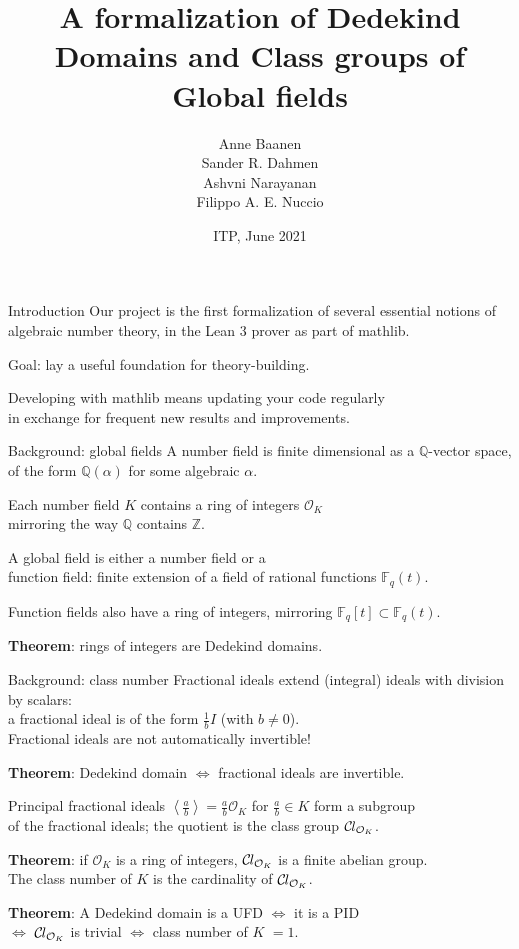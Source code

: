 \documentclass{beamer}
\title{A formalization of Dedekind Domains and Class groups of Global fields}
\author{Anne Baanen \\ Sander R. Dahmen \\ Ashvni Narayanan \\ Filippo A. E. Nuccio}
\date{ITP, June 2021}
\newcommand*{\OK}[1][K]{\mathcal{O}_{#1}}
\newcommand*{\Cl}{\mathcal{C}\kern-.075em l}
\newcommand*{\Fq}[1][q]{\mathbb{F}_{#1}}
\newcommand{\mathlib}{\textsf{mathlib}\xspace}
\newcommand{\Q}{\mathbb{Q}}
\newcommand{\Z}{\mathbb{Z}}
\begin{document}
\begin{frame}
	\maketitle
\end{frame}

\begin{frame}{Introduction}
	Our project is the first formalization of several essential notions of
	\alert{algebraic number theory}, in the Lean 3 prover as part of \mathlib.

	Goal: lay a useful foundation for theory-building.

	Developing with \mathlib means updating your code regularly\\
	in exchange for frequent new results and improvements.
\end{frame}

\begin{frame}{Background: global fields}
	A \alert{number field} is finite dimensional as a $\Q$-vector space,\\
	of the form $\Q(\alpha)$ for some algebraic $\alpha$.

\pause
	Each number field $K$ contains a \alert{ring of integers} $\OK$\\
	mirroring the way $\Q$ contains $\Z$.

\pause
	A \alert{global field} is either a \alert{number field} or a\\
	\alert{function field}: finite extension of a field of rational functions $\Fq(t)$.

	Function fields also have a ring of integers, mirroring $\Fq[q][t] \subset \Fq(t)$.

\pause
	\textbf{Theorem}: rings of integers are \alert{Dedekind domains}.
\end{frame}

\begin{frame}{Background: class number}
	\alert{Fractional ideals} extend (integral) ideals with division by scalars:\\
	a fractional ideal is of the form $\frac{1}{b} I$ (with $b \ne 0$).\\
	\alert{Fractional ideals are not automatically invertible!}

\pause
	\textbf{Theorem}: Dedekind domain $\iff$ fractional ideals are invertible.

\pause
	Principal fractional ideals $\left\langle \frac{a}{b} \right\rangle = \frac{a}{b} \OK$ for $\frac{a}{b} \in K$ form a subgroup\\
	of the fractional ideals; the quotient is the \alert{class group} $\Cl_{\OK}$.

	\textbf{Theorem}: if $\OK$ is a ring of integers, $\Cl_{\OK}$ is a finite abelian group.\\
	The \alert{class number} of $K$ is the cardinality of $\Cl_{\OK}$.

\pause
	\textbf{Theorem}: A Dedekind domain is a UFD $\iff$ it is a PID\\
	$\iff$ $\Cl_{\OK}$ is trivial $\iff$ class number of $K$ $= 1$.
\end{frame}
\end{document}
